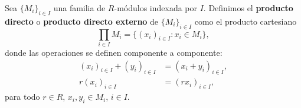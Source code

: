 %
%
%

\begin{definicion}
	Sea \(\{M_{i}\}_{i \in I}\) una familia de \(R\)-módulos indexada por \(I\).
	Definimos el \textbf{producto directo} o \textbf{producto directo externo} de
	\(\{M_{i}\}_{i \in I}\) como el producto cartesiano
	\[
	\prod_{i \in I}M_{i}= \{(x_{i})_{i \in I}: x_{i}\in M_{i}\},
	\]
	donde las operaciones se definen componente a componente:
	\begin{align*}
		(x_{i})_{i \in I}+ (y_{i})_{i \in I} & = (x_{i}+y_{i})_{i \in I}, \\
		r(x_{i})_{i \in I}                   & = (rx_{i})_{i \in I},
	\end{align*}
	para todo \(r \in R\), \(x_{i},y_{i}\in M_{i}\), \(i \in I\).
\end{definicion}

